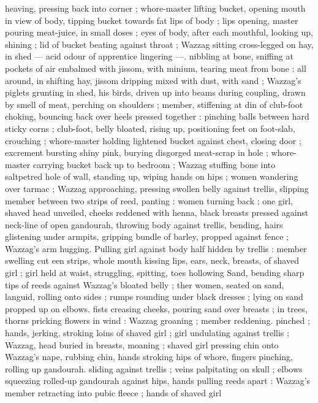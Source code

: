heaving, pressing back into corner ; whore-master lifting bucket, 
opening mouth in view of body, tipping bucket towards fat lips of 
body ; lips opening, master pouring meat-juice, in small doses ; eyes 
of body, after each mouthful, looking up, shining ; lid of bucket 
beating against throat ; Wazzag sitting cross-legged on hay, in shed 
--- acid odour of apprentice lingering ---. nibbling at bone, sniffing 
at pockets of air embalmed with jissom, with minium, tearing meat 
from bone : all around, in shifting hay, jissom dripping mixed with 
dust, with sand ; Wazzag's piglets grunting in shed, his birds, driven 
up into beams during coupling, drawn by smell of meat, perching on 
shoulders ; member, stiffening at din of club-foot choking, bouncing 
back over heels pressed together : pinching balls between hard 
sticky corns ; club-foot, belly bloated, rising up, positioning feet on 
foot-slab, crouching ; whore-master holding lightened bucket against 
chest, closing door ; excrement bursting shiny pink, burying 
disgorged meat-scrap in hole ; whore-master carrying bucket back 
up to bedroom ; Wazzag stuffing bone into saltpetred hole of wall, 
standing up, wiping hands on hips ; women wandering over tarmac ; 
Wazzag approaching, pressing swollen belly against trellis, slipping 
member between two strips of reed, panting : women turning back ; 
one girl, shaved head unveiled, cheeks reddened with henna, black 
breasts pressed against neck-line of open gandourah, throwing body 
against trellis, bending, hairs glistening under armpits, gripping 
bundle of barley, propped against fence ; Wazzag's arm hugging. 
Pulling girl against body half hidden by trellis : member swelling cut 
een strips, whole mouth kissing lips, ears, neck, breasts, of 
shaved girl ; girl held at waist, struggling, spitting, toes hollowing 
Sand, bending sharp tips of reeds against Wazzag's bloated belly ; 
ther women, seated on sand, languid, rolling onto sides ; rumps 
rounding under black dresses ; lying on sand propped up on elbows. 
fists creasing cheeks, pouring sand over breasts ; in trees, thorns 
pricking flowers in wind : Wazzag groaning ; member reddening. 
pinched ; hands, jerking, stroking loins of shaved girl ; girl 
undulating against trellis ; Wazzag, head buried in breasts, moaning 
; shaved girl pressing chin onto Wazzag's nape, rubbing chin, hands 
stroking hips of whore, fingers pinching, rolling up gandourah. 
sliding against trellis ; veins palpitating on skull ; elbows squeezing 
rolled-up gandourah against hips, hands pulling reeds apart : 
Wazzag's member retracting into pubic fleece ; hands of shaved girl 
